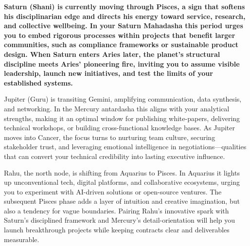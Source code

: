 
\label{topic57}

{\fontsize{9.5}{13.8}\selectfont\bfseries\color{DeepSlate} Saturn (Shani) is currently moving through Pisces, a sign that softens his disciplinarian edge and directs his energy toward service, research, and collective wellbeing. In your Saturn Mahadasha this period urges you to embed rigorous processes within projects that benefit larger communities, such as compliance frameworks or sustainable product design. When Saturn enters Aries later, the planet's structural discipline meets Aries' pioneering fire, inviting you to assume visible leadership, launch new initiatives, and test the limits of your established systems.}\par\vspace{2mm}

{\fontsize{9}{13}\selectfont Jupiter (Guru) is transiting Gemini, amplifying communication, data synthesis, and networking. In the Mercury antardasha this aligns with your analytical strengths, making it an optimal window for publishing white-papers, delivering technical workshops, or building cross-functional knowledge bases. As Jupiter moves into Cancer, the focus turns to nurturing team culture, securing stakeholder trust, and leveraging emotional intelligence in negotiations---qualities that can convert your technical credibility into lasting executive influence.}\par\vspace{1.8mm}

{\fontsize{9}{13}\selectfont Rahu, the north node, is shifting from Aquarius to Pisces. In Aquarius it lights up unconventional tech, digital platforms, and collaborative ecosystems, urging you to experiment with AI-driven solutions or open-source ventures. The subsequent Pisces phase adds a layer of intuition and creative imagination, but also a tendency for vague boundaries. Pairing Rahu's innovative spark with Saturn's disciplined framework and Mercury's detail-orientation will help you launch breakthrough projects while keeping contracts clear and deliverables measurable.}\par\vspace{1.8mm}

